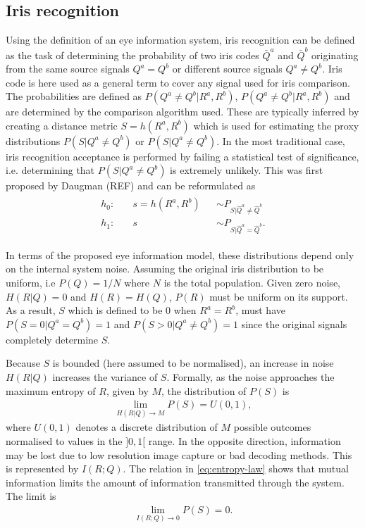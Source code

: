\subsection{Iris recognition}
Using the definition of an eye information system, iris recognition can be defined as the task of determining the probability of two iris codes $\bar{Q}^a$ and $\bar{Q}^b$ originating from the same source signals $Q^a = Q^b$ or different source signals $Q^a\neq Q^b$. Iris code is here used as a general term to cover any signal used for iris comparison. The probabilities are defined as $P(Q^a\neq Q^b|R^a, R^b)$, $P(Q^a\neq Q^b|R^a, R^b)$ and are determined by the comparison algorithm used. These are typically inferred by creating a distance metric $S = h(R^a, R^b)$ which is used for estimating the proxy distributions $P(S|Q^a\neq Q^b)$ or $P(S|Q^a\neq Q^b)$. In the most traditional case, iris recognition acceptance is performed by failing a statistical test of significance, i.e. determining that $P(S|Q^a\neq Q^b)$ is extremely unlikely. This was first proposed by Daugman (REF) and can be reformulated as
\begin{align}
\begin{aligned}
    h_0: & \quad s = h(R^a, R^b) &&\sim  P_{S|\hat{Q}^a\neq \hat{Q}^b}\\
    h_1: & \quad s && \sim  P_{S|\hat{Q}^a = \hat{Q}^b}.
\end{aligned}
\end{align}

In terms of the proposed eye information model, these distributions depend only on the internal system noise. Assuming the original iris distribution to be uniform, i.e $P(Q)=1/N$ where $N$ is the total population. Given zero noise, $H(R|Q)=0$ and $H(R)=H(Q)$, $P(R)$ must be uniform on its support. As a result, $S$ which is defined to be $0$ when $R^a = R^b$, must have $P(S=0|Q^a = Q^b)=1$ and $P(S>0|Q^a \neq Q^b)=1$ since the original signals completely determine $S$. 

Because $S$ is bounded (here assumed to be normalised), an increase in noise $H(R|Q)$ increases the variance of $S$. Formally, as the noise approaches the maximum entropy of $R$, given by $M$, the distribution of $P(S)$ is
\begin{align}
\lim_{H(R|Q)\rightarrow M} P(S) = U(0, 1),
\end{align}
where $U(0, 1)$ denotes a discrete distribution of $M$ possible outcomes normalised to values in the $]0, 1[$ range. In the opposite direction, information may be lost due to low resolution image capture or bad decoding methods. This is represented by $I(R;Q)$. The relation in \autoref{eq:entropy-law} shows that mutual information limits the amount of information transmitted through the system. The limit is
\begin{align}
\lim_{I(R;Q)\rightarrow 0} P(S) = 0.
\end{align}

